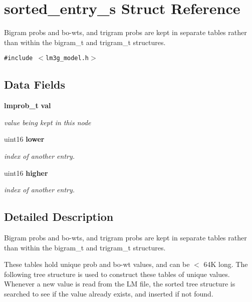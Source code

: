 \section{sorted\_\-entry\_\-s Struct Reference}
\label{structsorted__entry__s}
Bigram probs and bo-wts, and trigram probs are kept in separate tables rather than within the bigram\_\-t and trigram\_\-t structures.  


{\tt \#include $<$lm3g\_\-model.h$>$}

\subsection*{Data Fields}
\begin{CompactItemize}
\item 
{\bf lmprob\_\-t} {\bf val}\label{structsorted__entry__s_7bfd6c0c9c7240695a5909044177122f}

\begin{CompactList}\small\item\em value being kept in this node \item\end{CompactList}\item 
uint16 {\bf lower}
\begin{CompactList}\small\item\em index of another entry. \item\end{CompactList}\item 
uint16 {\bf higher}
\begin{CompactList}\small\item\em index of another entry. \item\end{CompactList}\end{CompactItemize}


\subsection{Detailed Description}
Bigram probs and bo-wts, and trigram probs are kept in separate tables rather than within the bigram\_\-t and trigram\_\-t structures. 

These tables hold unique prob and bo-wt values, and can be $<$ 64K long. The following tree structure is used to construct these tables of unique values. Whenever a new value is read from the LM file, the sorted tree structure is searched to see if the value already exists, and inserted if not found. 

